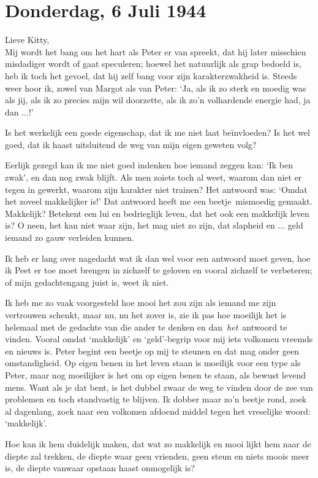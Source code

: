 \documentclass{book}
\begin{document}
\section*{Donderdag, 6 Juli 1944}

Lieve Kitty,\\
Mij wordt het bang om het hart als Peter er van spreekt, dat hij
later misschien misdadiger wordt of gaat speculeren; hoewel het natuurlijk als
grap bedoeld is, heb ik toch het gevoel, dat hij zelf bang voor zijn
karakterzwakheid is. Steeds weer hoor ik, zowel van Margot als van Peter: `Ja,
als ik zo sterk en moedig was als jij, als ik zo precies mijn wil doorzette, als
ik zo'n volhardende energie had, ja dan ...!'

Is het werkelijk een goede eigenschap, dat ik me niet laat beïnvloeden?  Is het
wel goed, dat ik haast uitsluitend de weg van mijn eigen geweten volg?

Eerlijk gezegd kan ik me niet goed indenken hoe iemand zeggen kan: `Ik ben
zwak', en dan nog zwak blijft. Als men zoiets toch al weet, waarom dan niet er
tegen in gewerkt, waarom zijn karakter niet trainen? Het antwoord was: `Omdat
het zoveel makkelijker is!' Dat antwoord heeft me een beetje~mismoedig gemaakt.
Makkelijk? Betekent een lui en bedrieglijk leven, dat het ook een makkelijk
leven is? O neen, het kan niet waar zijn, het mag niet zo zijn, dat slapheid en
... geld iemand zo gauw verleiden kunnen.

Ik heb er lang over nagedacht wat ik dan wel voor een antwoord moet geven, hoe
ik Peet er toe moet brengen in zichzelf te geloven en vooral zichzelf te
verbeteren; of mijn gedachtengang juist is, weet ik niet.

Ik heb me zo vaak voorgesteld hoe mooi het zou zijn als iemand me zijn
vertrouwen schenkt, maar nu, nu het zover is, zie ik pas hoe moeilijk het is
helemaal met de gedachte van die ander te denken en dan~\emph{het}~antwoord te
vinden. Vooral omdat `makkelijk' en `geld'-begrip voor mij iets volkomen vreemds
en nieuws is. Peter begint een beetje op mij te steunen en dat mag onder geen
omstandigheid. Op eigen benen in het leven staan is moeilijk voor een type als
Peter, maar nog moeilijker is het om op eigen benen te staan, als bewust levend
mens. Want als je dat bent, is het dubbel zwaar de weg te vinden door de zee van
problemen en toch standvastig te blijven. Ik dobber maar zo'n beetje rond, zoek
al dagenlang, zoek naar een volkomen afdoend middel tegen het vreselijke woord:
`makkelijk'.

Hoe kan ik hem duidelijk maken, dat wat zo makkelijk en mooi lijkt hem naar de
diepte zal trekken, de diepte waar geen vrienden, geen steun en niets moois meer
is, de diepte vanwaar opstaan haast onmogelijk is?
\end{document}
